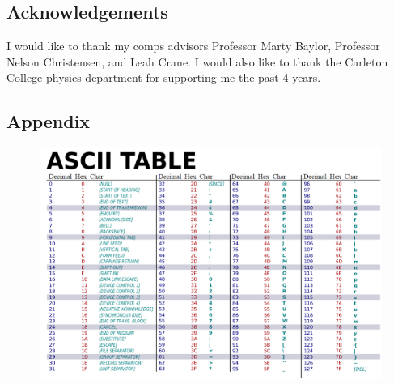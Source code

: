 \documentclass[ notitlepage, numerical, 11pt]{revtex4-1} %
\begin{document}
\section{Acknowledgements}
I would like to thank my comps advisors Professor Marty Baylor, Professor Nelson Christensen, and Leah Crane. I would also like to thank the Carleton College physics department for supporting me the past 4 years.



\newpage

\begin{appendices}
\chapter{Appendix}
\begin{figure}[H]
\centerline{\includegraphics[scale=.45]{ascii.png}}
\end{figure} 
\end{appendices}
\end{document}
